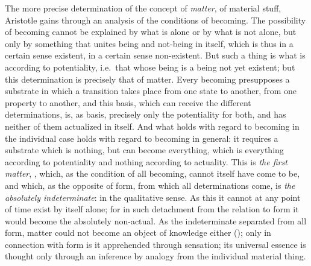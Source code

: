 The more precise determination of the concept of \emph{matter}, of material stuff, Aristotle gains through an analysis of the conditions of becoming. The possibility of becoming cannot be explained by what is
alone or by what is not alone, but only by something that unites being and not-being in itself, which is thus in a
certain sense existent, in a certain sense non-existent.
But such a thing is what is according to potentiality, i.e.\ that whose
being is a being not yet existent; but this determination
is precisely that of matter. Every becoming presupposes a substrate
in which a transition takes place from one state to another,
from one property to another, and this basis, which can
receive the different determinations, is, as basis, precisely
only the potentiality for both, and has neither of them actualized in
itself. And what holds with regard to becoming in the
individual case holds with regard to becoming in general: it
requires a substrate which is nothing, but can become everything,
which is everything according to potentiality and nothing according to actuality. This
is \emph{the first matter}, , which, as the condition of
all becoming, cannot itself have come to be, and which, as the opposite of form, from which all determinations come, is \emph{the
absolutely indeterminate}:  in the qualitative sense. As this  it cannot at any point of time
exist by itself alone; for in such detachment from the relation to form it would become the absolutely non-actual. As
the indeterminate separated from all form, matter could
not become an object of knowledge either (); only in connection with form is it apprehended
through sensation; its universal essence is thought
only through an inference by analogy from the individual material thing.

